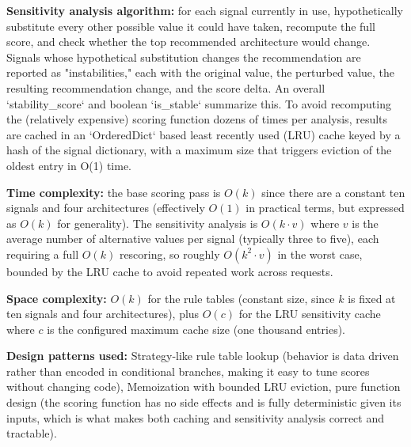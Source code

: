 \documentclass[11pt,a4paper]{report}
\begin{document}
\textbf{Sensitivity analysis algorithm:} for each signal currently in use, hypothetically substitute every other possible value it could have taken, recompute the full score, and check whether the top recommended architecture would change. Signals whose hypothetical substitution changes the recommendation are reported as "instabilities," each with the original value, the perturbed value, the resulting recommendation change, and the score delta. An overall `stability_score` and boolean `is_stable` summarize this. To avoid recomputing the (relatively expensive) scoring function dozens of times per analysis, results are cached in an `OrderedDict` based least recently used (LRU) cache keyed by a hash of the signal dictionary, with a maximum size that triggers eviction of the oldest entry in O(1) time.

\textbf{Time complexity:} the base scoring pass is $O(k)$ since there are a constant ten signals and four architectures (effectively $O(1)$ in practical terms, but expressed as $O(k)$ for generality). The sensitivity analysis is $O(k \cdot v)$ where $v$ is the average number of alternative values per signal (typically three to five), each requiring a full $O(k)$ rescoring, so roughly $O(k^2 \cdot v)$ in the worst case, bounded by the LRU cache to avoid repeated work across requests.

\textbf{Space complexity:} $O(k)$ for the rule tables (constant size, since $k$ is fixed at ten signals and four architectures), plus $O(c)$ for the LRU sensitivity cache where $c$ is the configured maximum cache size (one thousand entries).

\textbf{Design patterns used:} Strategy-like rule table lookup (behavior is data driven rather than encoded in conditional branches, making it easy to tune scores without changing code), Memoization with bounded LRU eviction, pure function design (the scoring function has no side effects and is fully deterministic given its inputs, which is what makes both caching and sensitivity analysis correct and tractable).
\end{document}
